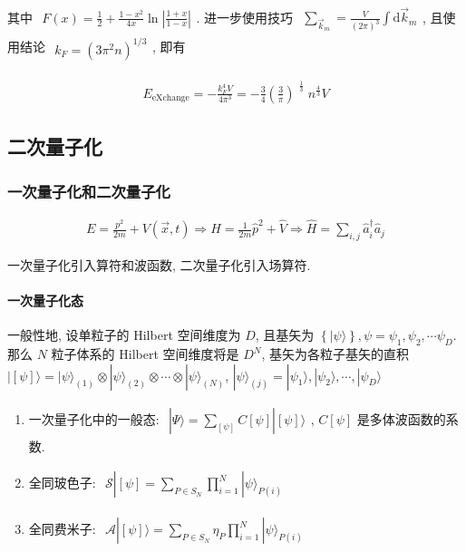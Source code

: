 \documentclass[../../main.tex]{subfiles}
\begin{document}
其中 $\begin{aligned}
  F(x) = \frac{1}{2} + \frac{1 - x^{2}}{4x}\ln{\left|\frac{1 + x}{1 - x}\right|}
\end{aligned}$. 进一步使用技巧 $\begin{aligned}
  \sum_{\vec{k}_{m}} = \frac{V}{(2\pi)^{3}}\int\mathrm{d}\vec{k}_{m}
\end{aligned}$, 且使用结论 $\begin{aligned}
  k_{F} = \left(3\pi^{2}n\right)^{1/3}
\end{aligned}$, 即有

\begin{align*}
  E_{\text{eXchange}} = \boxed{-\frac{k_{F}^{4}V}{4\pi^{3}}} = -\frac{3}{4}\left(\frac{3}{\pi}\right)^{\begin{aligned}
    \frac{1}{3}
  \end{aligned}}n^{\frac{4}{3}}V
\end{align*}
 
\subsection{二次量子化}
\subsubsection{一次量子化和二次量子化}

\begin{align*}
  E = \frac{p^{2}}{2m} + V(\vec{x},t) \Rightarrow \hat{H} = \frac{1}{2m}\hat{p}^{2} + \hat{V} \Rightarrow \hat{H} = \sum_{i,j}\hat{a}_{i}^{\dagger}\hat{a}_{j}
\end{align*}

一次量子化引入算符和波函数, 二次量子化引入场算符. 
\paragraph{一次量子化态}

一般性地, 设单粒子的 Hilbert 空间维度为 $D$, 且基矢为 $\left\{|\psi\rangle\right\},\psi = \psi_{1},\psi_{2},\cdots \psi_{D}$. 那么 $N$ 粒子体系的 Hilbert 空间维度将是 $D^{N}$, 基矢为各粒子基矢的直积 $|[\psi]\rangle = |\psi\rangle_{(1)}\otimes |\psi\rangle_{(2)}\otimes\cdots\otimes|\psi\rangle_{(N)}$, $|\psi\rangle_{(j)} = |\psi_{1}\rangle,|\psi_{2}\rangle,\cdots,|\psi_{D}\rangle$

\begin{enumerate}
  \item 一次量子化中的一般态: $\begin{aligned}
    |\Psi\rangle = \sum_{[\psi]}C[\psi]|[\psi]\rangle
  \end{aligned}$, $C[\psi]$ 是多体波函数的系数. 
  \item 全同玻色子: $\begin{aligned}
    \mathcal{S}|[\psi] = \sum_{P\in S_{N}}\prod_{i=1}^{N}|\psi\rangle_{{P(i)}}
  \end{aligned}$
  \item 全同费米子: $\begin{aligned}
    \mathcal{A}|[\psi]\rangle = \sum_{P\in S_{N}}\eta_{P}\prod_{i=1}^{N}|\psi\rangle_{P(i)}
  \end{aligned}$
\end{enumerate}
\end{document}
